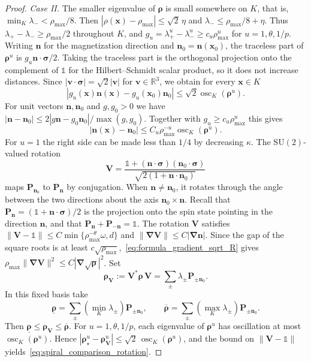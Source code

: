 \documentclass[final,reqno]{amsart}
\theoremstyle{remark}
\renewcommand{\le}{\leqslant}
\renewcommand{\ge}{\geqslant}
\newcommand{\ol}[1]{\overline{#1}}
\newcommand{\ul}[1]{\underline{#1}}
\newcommand{\RR}{\mathbb{R}}
\newcommand{\SU}{\mathrm{SU}}
\newcommand{\iden}{\mathbb{1}}
\newcommand{\grad}{\bm{\nabla}}
\begin{document}
\begin{proof}
\noindent\emph{Case II.} The smaller eigenvalue of $\bm{\rho}$ is small somewhere on $K$, that is, $\min_K\lambda_-<\rho_{\max}/8$. Then $|\rho(\mathbf{x})-\rho_{\max}|\le\sqrt2\,\eta$ and $\lambda_-\le \rho_{\max}/8+\eta$. Thus $\lambda_+-\lambda_-\ge \rho_{\max}/2$ throughout $K$, and $g_u=\lambda_+^u-\lambda_-^u\ge c_u \rho_{\max}^u$ for $u=1,\theta,1/p$. Writing $\mathbf{n}$ for the magnetization direction and $\mathbf{n}_0=\mathbf{n}(\mathbf{x}_0)$, the traceless part of $\bm{\rho}^u$ is $g_u\mathbf{n}\cdot\bm{\sigma}/2$. Taking the traceless part is the orthogonal projection onto the complement of $\iden$ for the Hilbert--Schmidt scalar product, so it does not increase distances. Since $|\mathbf{v}\cdot\bm{\sigma}|=\sqrt2|\mathbf{v}|$ for $\mathbf{v}\in\RR^3$, we obtain for every $\mathbf{x}\in K$
\[
|g_u(\mathbf{x})\mathbf{n}(\mathbf{x})-g_u(\mathbf{x}_0)\mathbf{n}_0|\le\sqrt2\operatorname{osc}_K(\bm{\rho}^u).
\]
For unit vectors $\mathbf{n},\mathbf{n}_0$ and $g,g_0>0$ we have $|\mathbf{n}-\mathbf{n}_0|\le2|g\mathbf{n}-g_0\mathbf{n}_0|/\max(g,g_0)$. Together with $g_u\ge c_u\rho_{\max}^u$ this gives
\[
|\mathbf{n}(\mathbf{x})-\mathbf{n}_0|\le C_u \rho_{\max}^{-u}\operatorname{osc}_K(\bm{\rho}^u).
\]
For $u=1$ the right side can be made less than $1/4$ by decreasing $\kappa$. The $\SU(2)$-valued rotation
\[
\mathbf{V}=\frac{\iden+(\mathbf{n}\cdot\bm{\sigma})(\mathbf{n}_0\cdot\bm{\sigma})}
 {\sqrt{2(1+\mathbf{n}\cdot\mathbf{n}_0)}}
\]
maps $\mathbf{P}_{\mathbf{n}_0}$ to $\mathbf{P}_{\mathbf{n}}$ by conjugation. When $\mathbf{n}\ne\mathbf{n}_0$, it rotates through the angle between the two directions about the axis $\mathbf{n}_0\times\mathbf{n}$. Recall that $\mathbf{P}_{\mathbf{n}}=(\iden+\mathbf{n}\cdot\bm{\sigma})/2$ is the projection onto the spin state pointing in the direction $\mathbf{n}$, and that $\mathbf{P}_{\mathbf{n}}+\mathbf{P}_{-\mathbf{n}}=\iden$. The rotation $\mathbf{V}$ satisfies $\|\mathbf{V}-\iden\|\le C\min\{\rho_{\max}^{-\theta}\omega,d\}$ and $\|\grad\mathbf{V}\|\le C|\grad\mathbf{n}|$. Since the gap of the square roots is at least $c\sqrt{\rho_{\max}}$,~\cref{eq:formula_gradient_sqrt_R} gives $\rho_{\max}\|\grad\mathbf{V}\|^2\le C|\grad\sqrt{\bm{\rho}}|^2$.
Set
\begin{equation*}
\bm{\rho}_{\mathbf{V}}:=\mathbf{V}^*\bm{\rho}\,\mathbf{V}=\sum_{\pm}\lambda_\pm\mathbf{P}_{\pm\mathbf{n}_0}.
\end{equation*}
In this fixed basis take
\[
\ul{\bm{\rho}}=\sum_{\pm}(\min_K\lambda_\pm)\mathbf{P}_{\pm\mathbf{n}_0},\qquad
\ol{\bm{\rho}}=\sum_{\pm}(\max_K\lambda_\pm)\mathbf{P}_{\pm\mathbf{n}_0}.
\]
Then $\ul{\bm{\rho}}\le\bm{\rho}_{\mathbf{V}}\le\ol{\bm{\rho}}$. For $u=1,\theta,1/p$, each eigenvalue of $\bm{\rho}^u$ has oscillation at most $\operatorname{osc}_K(\bm{\rho}^u)$. Hence $|\bm{\rho}_\star^u-\bm{\rho}_{\mathbf{V}}^u|\le\sqrt2\,\operatorname{osc}_K(\bm{\rho}^u)$, and the bound on $\|\mathbf{V}-\iden\|$ yields~\cref{eq:spiral_comparison_rotation}.


\end{proof}
\end{document}
